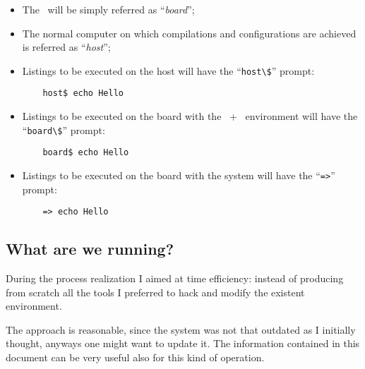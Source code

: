     \begin{itemize}

    \item   The \MyBoard\ will be simply referred as
            ``\emph{board}'';

    \item   The normal computer on which compilations and
            configurations are achieved is referred as
            ``\emph{host}'';

    \item   Listings to be executed on the host will have the
            ``\lstinline{host\$}'' prompt:
\begin{lstlisting}
    host$ echo Hello
\end{lstlisting}

    \item   Listings to be executed on the board with the
            \BusyBox\ + \Linux\ environment will have the
            ``\lstinline{board\$}'' prompt:
\begin{lstlisting}
    board$ echo Hello
\end{lstlisting}

    \item   Listings to be executed on the board with the \uBoot
            system will have the ``\lstinline{=>}'' prompt:
\begin{lstlisting}
    => echo Hello
\end{lstlisting}


    \end{itemize}

        \subsection{ What are we running? }

            During the process realization I aimed at time efficiency:
            instead of producing from scratch all the tools I preferred to
            hack and modify the existent environment.

            The approach is reasonable, since the system was not that
            outdated as I initially thought, anyways one might want to
            update it. The information contained in this document can be
            very useful also for this kind of operation.


